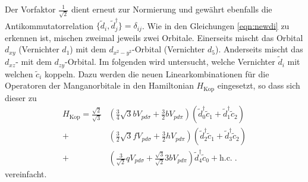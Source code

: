 Der Vorfaktor $\frac{1}{\sqrt{2}}$ dient erneut zur Normierung und gewährt ebenfalls die Antikommutatorrelation $\{ \tilde{d}_i, \tilde{d}^\dagger_j \} = \delta_{ij}$.
Wie in den Gleichungen \eqref{eqn:newdi} zu erkennen ist, mischen zweimal jeweils zwei Orbitale.
Einerseits mischt das Orbital $d_{xy}$ (Vernichter $d_1$) mit dem $d_{x^2-y^2}$-Orbital (Vernichter $d_5$).
Anderseits mischt das $d_{xz}$- mit dem $d_{zy}$-Orbital.
Im folgenden wird untersucht, welche Vernichter $\tilde{d}_i$ mit welchen $\tilde{c}_i$ koppeln.
Dazu werden die neuen Linearkombinationen für die Operatoren der Manganorbitale in den Hamiltonian $H_\text{Kop}$ eingesetzt, so dass sich dieser zu
\begin{equation}
            \begin{split}
                H_\text{Kop} = \frac{\sqrt{2}}{\sqrt{3}} 
                & \left ( \frac{3}{4}\sqrt{3} b V_{pd\sigma} + \frac{3}{2}  b   V_{pd\pi} \right )      \left ( \tilde{d}^\dagger_0 \tilde{c}_1 + \tilde{d}^\dagger_1 \tilde{c}_2 \right )   \\
            +    & \left ( \frac{3}{2}\sqrt{3} f V_{pd\sigma} + \frac{3}{2}  h   V_{pd\pi} \right )     \left ( \tilde{d}^\dagger_2 \tilde{c}_1 + \tilde{d}^\dagger_3 \tilde{c}_2 \right )   \\
            +    & \left ( \frac{3}{\sqrt{2}} q V_{pd\sigma} + \frac{\sqrt{3}}{\sqrt{2}} 3 b V_{pd\pi} \right ) \tilde{d}^\dagger_4 \tilde{c}_0 + \text{h.c.} \; .
            \end{split}
            \label{eqn:Hkopnice}
\end{equation}
vereinfacht. 